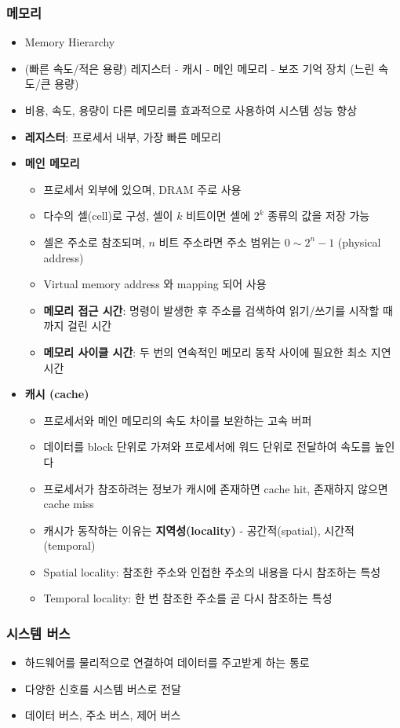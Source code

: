 \subsubsection{메모리}
\begin{itemize}
	\item Memory Hierarchy
	\item (빠른 속도/적은 용량) 레지스터 - 캐시 - 메인 메모리 - 보조 기억 장치 (느린 속도/큰 용량)
	\item 비용, 속도, 용량이 다른 메모리를 효과적으로 사용하여 시스템 성능 향상
	\item \textbf{레지스터}: 프로세서 내부, 가장 빠른 메모리
	\item \textbf{메인 메모리}
	\begin{itemize}
		\item 프로세서 외부에 있으며, DRAM 주로 사용
		\item 다수의 셀(cell)로 구성, 셀이 $k$ 비트이면 셀에 $2^k$ 종류의 값을 저장 가능
		\item 셀은 주소로 참조되며, $n$ 비트 주소라면 주소 범위는 $0 \sim 2^n-1$ (physical address)
		\item Virtual memory address 와 mapping 되어 사용
		\item \textbf{메모리 접근 시간}: 명령이 발생한 후 주소를 검색하여 읽기/쓰기를 시작할 때까지 걸린 시간
		\item \textbf{메모리 사이클 시간}: 두 번의 연속적인 메모리 동작 사이에 필요한 최소 지연 시간
	\end{itemize}
	\item \textbf{캐시 (cache)}
	\begin{itemize}
		\item 프로세서와 메인 메모리의 속도 차이를 보완하는 고속 버퍼
		\item 데이터를 block 단위로 가져와 프로세서에 워드 단위로 전달하여 속도를 높인다
		\item 프로세서가 참조하려는 정보가 캐시에 존재하면 cache hit, 존재하지 않으면 cache miss
		\item 캐시가 동작하는 이유는 \textbf{지역성(locality)} - 공간적(spatial), 시간적(temporal)
		\item Spatial locality: 참조한 주소와 인접한 주소의 내용을 다시 참조하는 특성
		\item Temporal locality: 한 번 참조한 주소를 곧 다시 참조하는 특성
	\end{itemize}
\end{itemize}

\subsubsection{시스템 버스}
\begin{itemize}
	\item 하드웨어를 물리적으로 연결하여 데이터를 주고받게 하는 통로
	\item 다양한 신호를 시스템 버스로 전달
	\item 데이터 버스, 주소 버스, 제어 버스
\end{itemize}

